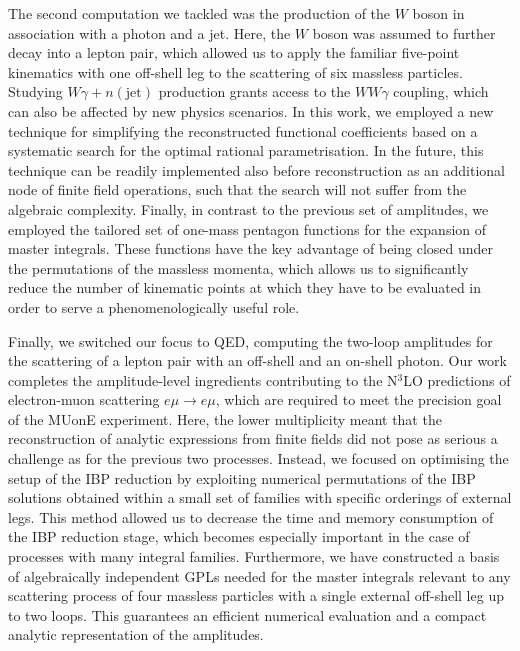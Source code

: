 \documentclass[main.tex]{subfiles}
\begin{document}
The second computation we tackled was the production of the $W$ boson in association with a photon and a jet. Here, the $W$ boson was assumed to further decay into a lepton pair, which allowed us to apply the familiar five-point kinematics with one off-shell leg to the scattering of six massless particles. Studying $W\gamma + n (\text{jet})$ production grants access to the $W W \gamma$ coupling, which can also be affected by new physics scenarios. In this work, we employed a new technique for simplifying the reconstructed functional coefficients based on a systematic search for the optimal rational parametrisation. In the future, this technique can be readily implemented also before reconstruction as an additional node of finite field operations, such that the search will not suffer from the algebraic complexity. Finally, in contrast to the previous set of amplitudes, we employed the tailored set of one-mass pentagon functions for the expansion of master integrals. These functions have the key advantage of being closed under the permutations of the massless momenta, which allows us to significantly reduce the number of kinematic points at which they have to be evaluated in order to serve a phenomenologically useful role.

Finally, we switched our focus to QED, computing the two-loop amplitudes for the scattering of a lepton pair with an off-shell and an on-shell photon. Our work completes the amplitude-level ingredients contributing to the N$^3$LO predictions of electron-muon scattering $e \mu \to e \mu$, which are required to meet the precision goal of the MUonE experiment. Here, the lower multiplicity meant that the reconstruction of analytic expressions from finite fields did not pose as serious a challenge as for the previous two processes. Instead, we focused on optimising the setup of the IBP reduction by exploiting numerical permutations of the IBP solutions obtained within a small set of families with specific orderings of external legs. This method allowed us to decrease the time and memory consumption of the IBP reduction stage, which becomes especially important in the case of processes with many integral families. Furthermore, we have constructed a basis of algebraically independent GPLs needed for the master integrals relevant to any scattering process of four massless particles with a single external off-shell leg up to two loops. This guarantees an efficient numerical evaluation and a compact analytic representation of the amplitudes.
\end{document}
